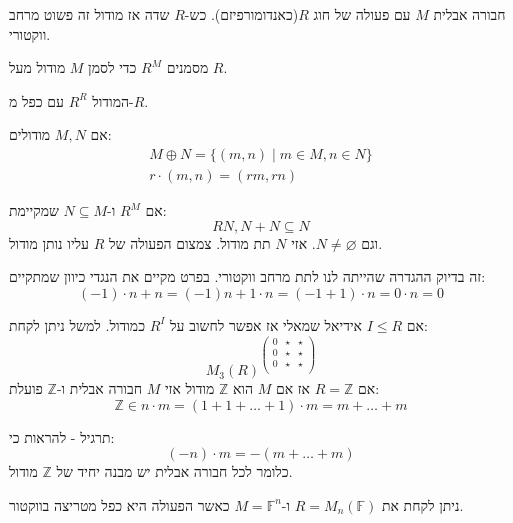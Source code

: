 \documentclass{tstextbook}
\begin{document}
\begin{reminder}[מודל]
חבורה אבלית \(M\) עם פעולה של חוג \(R\)(כאנדומורפיזם).
כש-\(R\) שדה אז מודול זה פשוט מרחב ווקטורי.

\end{reminder}
\begin{symbolize}
מסמנים \(R^{M}\) כדי לסמן \(M\) מודול מעל \(R\).

\end{symbolize}
\begin{example}
המודול \(R^{R}\) עם כפל מ-\(R\).

\end{example}
\begin{example}
אם \(M,N\) מודולים:
$$\begin{gather}M\oplus N=\{ (m,n)\mid m \in M, n \in N \} \\r\cdot(m,n)=(r m, rn)
\end{gather}$$

\end{example}
\begin{definition}[תת מודול]
אם \(R^{M}\) ו-\(N\subseteq M\) שמקיימת:
$$RN, N+N\subseteq N$$
וגם \(N\neq \varnothing\). אזי \(N\) תת מודול. צמצום הפעולה של \(R\) עליו נותן מודול.

\end{definition}
\begin{remark}
זה בדיוק ההגדרה שהייתה לנו לתת מרחב ווקטורי. בפרט מקיים את הנגדי כיוון שמתקיים:
$$(-1)\cdot n+n=(-1)n+1\cdot n=(-1+1)\cdot n=0\cdot n=0$$

\end{remark}
אם \(I\leq R\) אידיאל שמאלי אז אפשר לחשוב על \(R^{I}\) כמודול. למשל ניתן לקחת:
$$M_{3}(R)^{\begin{pmatrix}0& \star &\star\\0& \star &\star\\0& \star &\star\\
\end{pmatrix}}$$
אם \(R=\mathbb{Z}\) אז אם \(M\) הוא \(\mathbb{Z}\) מודול אזי \(M\) חבורה אבלית ו-\(\mathbb{Z}\) פועלת:
$$\mathbb{Z} \in n\cdot m =(1+1+\dots+1)\cdot m=m+\dots+m$$

תרגיל - להראות כי:
$$(-n)\cdot m=-(m+\dots+m)$$
כלומר לכל חבורה אבלית יש מבנה יחיד של \(\mathbb{Z}\) מודול.

ניתן לקחת את \(R=M_{n}(\mathbb{F})\) ו-\(M=\mathbb{F}^{n}\) כאשר הפעולה היא כפל מטריצה בווקטור.
\end{document}
